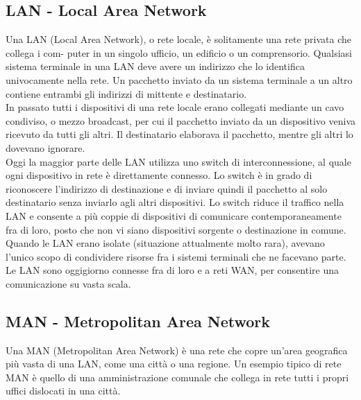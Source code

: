 \documentclass[12pt]{report}
\begin{document}
	\subsection{LAN - Local Area Network}
	Una LAN (Local Area Network), o rete locale, è solitamente una rete privata che collega i com- puter in un singolo ufficio, un edificio o un comprensorio. Qualsiasi sistema terminale in una LAN deve avere un indirizzo che lo identifica univocamente nella rete. Un pacchetto inviato da un sistema terminale a un altro contiene entrambi gli indirizzi di mittente e destinatario.
	\vspace{\baselineskip}\\
	In passato tutti i dispositivi di una rete locale erano collegati mediante un cavo condiviso, o mezzo broadcast, per cui il pacchetto inviato da un dispositivo veniva ricevuto da tutti gli altri. Il destinatario elaborava il pacchetto, mentre gli altri lo dovevano ignorare. 
	\vspace{\baselineskip}\\
	Oggi la maggior parte delle LAN utilizza uno switch di interconnessione, al quale ogni dispositivo in rete è direttamente connesso. Lo switch è in grado di riconoscere l'indirizzo di destinazione e di inviare quindi il pacchetto al solo destinatario senza inviarlo agli altri dispositivi. Lo switch riduce il traffico nella LAN e consente a più coppie di dispositivi di comunicare contemporaneamente fra di loro, posto che non vi siano dispositivi sorgente o destinazione in comune. Quando le LAN erano isolate (situazione attualmente molto rara), avevano l'unico scopo di condividere risorse fra i sistemi terminali che ne facevano parte. Le LAN sono oggigiorno connesse fra di loro e a reti WAN, per consentire una comunicazione su vasta scala.

	\subsection{MAN - Metropolitan Area Network}
	Una MAN (Metropolitan Area Network) è una rete che copre un'area geografica più vasta di una LAN, come una città o una regione. Un esempio tipico di rete MAN è quello di una amministrazione comunale che collega in rete tutti i propri uffici dislocati in una città.
\end{document}
